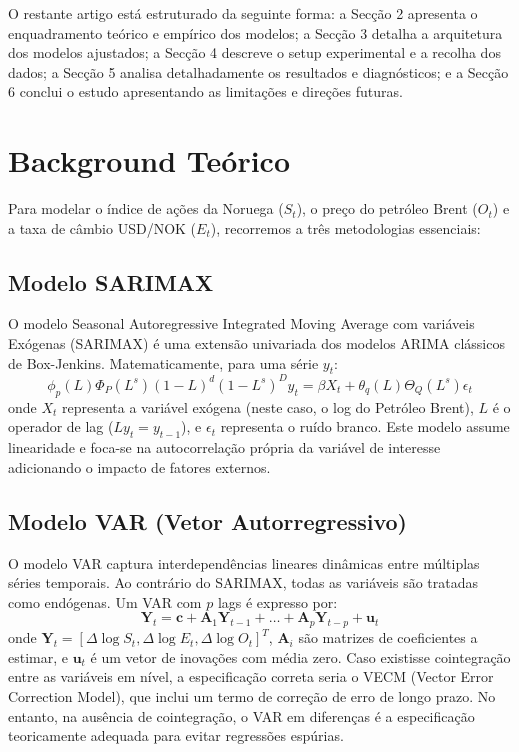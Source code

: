 \documentclass[11pt,a4paper]{article}
\begin{document}
O restante artigo está estruturado da seguinte forma: a Secção 2 apresenta o enquadramento teórico e empírico dos modelos; a Secção 3 detalha a arquitetura dos modelos ajustados; a Secção 4 descreve o setup experimental e a recolha dos dados; a Secção 5 analisa detalhadamente os resultados e diagnósticos; e a Secção 6 conclui o estudo apresentando as limitações e direções futuras.

\section{Background Teórico}
Para modelar o índice de ações da Noruega ($S_t$), o preço do petróleo Brent ($O_t$) e a taxa de câmbio USD/NOK ($E_t$), recorremos a três metodologias essenciais:

\subsection{Modelo SARIMAX}
O modelo Seasonal Autoregressive Integrated Moving Average com variáveis Exógenas (SARIMAX) é uma extensão univariada dos modelos ARIMA clássicos de Box-Jenkins. Matematicamente, para uma série $y_t$:
\begin{equation}
\phi_p(L)\Phi_P(L^s)(1-L)^d(1-L^s)^D y_t = \beta X_t + \theta_q(L)\Theta_Q(L^s)\epsilon_t
\end{equation}
onde $X_t$ representa a variável exógena (neste caso, o log do Petróleo Brent), $L$ é o operador de lag ($L y_t = y_{t-1}$), e $\epsilon_t$ representa o ruído branco. Este modelo assume linearidade e foca-se na autocorrelação própria da variável de interesse adicionando o impacto de fatores externos.

\subsection{Modelo VAR (Vetor Autorregressivo)}
O modelo VAR captura interdependências lineares dinâmicas entre múltiplas séries temporais. Ao contrário do SARIMAX, todas as variáveis são tratadas como endógenas. Um VAR com $p$ lags é expresso por:
\begin{equation}
\mathbf{Y}_t = \mathbf{c} + \mathbf{A}_1 \mathbf{Y}_{t-1} + \dots + \mathbf{A}_p \mathbf{Y}_{t-p} + \mathbf{u}_t
\end{equation}
onde $\mathbf{Y}_t = [\Delta \log S_t, \Delta \log E_t, \Delta \log O_t]^T$, $\mathbf{A}_i$ são matrizes de coeficientes a estimar, e $\mathbf{u}_t$ é um vetor de inovações com média zero. Caso existisse cointegração entre as variáveis em nível, a especificação correta seria o VECM (Vector Error Correction Model), que inclui um termo de correção de erro de longo prazo. No entanto, na ausência de cointegração, o VAR em diferenças é a especificação teoricamente adequada para evitar regressões espúrias.
\end{document}
